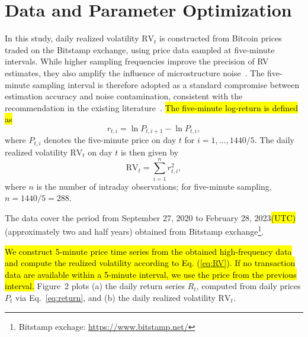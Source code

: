 \documentclass[preprints,article,accept,pdftex,oneauthor]{Definitions/mdpi}
\begin{document}




 
\section{Data and Parameter Optimization}
 
In this study, daily realized volatility $\mathrm{RV}_t$ is
constructed from Bitcoin prices traded on the Bitstamp exchange, using
price data sampled at five-minute intervals. While higher sampling
frequencies improve the precision of RV estimates, they
also amplify the influence of microstructure noise~\cite{zhou1996high,bandi2006separating,bandi2008microstructure,hansen2006realized}. The five-minute
sampling interval is therefore adopted as a standard compromise between
estimation accuracy and noise contamination, consistent with the
recommendation in the existing literature~\cite{liu2015does}. \hl{The five-minute log-return is
defined as}
\begin{equation}
  r_{t,i} = \ln P_{t,i+1} - \ln P_{t,i}, \label{eq:return}
\end{equation}
where $P_{t,i}$ denotes the five-minute price on day $t$ for $i=1,...,1440/5$. The daily realized volatility $\mathrm{RV}_t$ on day $t$
is then given by
\begin{equation}
  \mathrm{RV}_t = \sum_{i=1}^{n} r_{t,i}^2,
  \label{eq:RV}
\end{equation}
where $n$ is the number of intraday observations; for five-minute
sampling, $n = 1440/5 = 288$.
 
The data cover the period from September 27, 2020 to February 28, 2023\hl{(UTC)}
(approximately two and half years) obtained from Bitstamp exchange\footnote{Bitstamp exchage: \url{https://www.bitstamp.net/}}. 

\hl{We construct 5-minute price time series from the obtained high-frequency data and compute the realized volatility according to Eq. (\mbox{\ref{eq:RV}}). If no transaction data are available within a 5-minute interval, we use the price from the previous interval.}
Figure~2 plots (a) the daily return series
$R_t$, computed from daily prices $P_t$ via Eq.~\eqref{eq:return}, and
(b) the daily realized volatility $\mathrm{RV}_t$.
\end{document}
